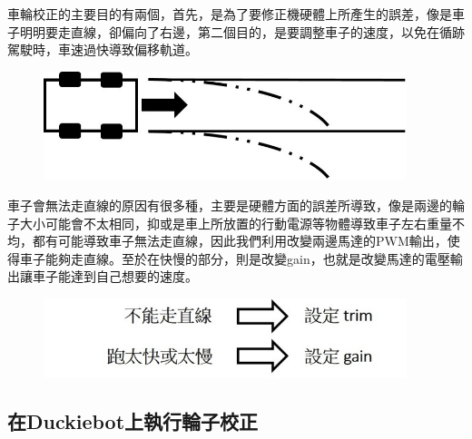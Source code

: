 \documentclass{article}
\begin{document}
車輪校正的主要目的有兩個，首先，是為了要修正機硬體上所產生的誤差，像是車子明明要走直線，卻偏向了右邊，第二個目的，是要調整車子的速度，以免在循跡駕駛時，車速過快導致偏移軌道。
\\
\begin{figure}[htp]
    \begin{center}
        \includegraphics[width=300pt]{pic/圖片22.jpg}
    \end{center}
\end{figure}
車子會無法走直線的原因有很多種，主要是硬體方面的誤差所導致，像是兩邊的輪子大小可能會不太相同，抑或是車上所放置的行動電源等物體導致車子左右重量不均，都有可能導致車子無法走直線，因此我們利用改變兩邊馬達的PWM輸出，使得車子能夠走直線。至於在快慢的部分，則是改變gain，也就是改變馬達的電壓輸出讓車子能達到自己想要的速度。
\\
\begin{figure}[htp]
    \begin{center}
        \includegraphics[width=300pt]{pic/圖片23.jpg}
    \end{center}
\end{figure}

\subsection{在Duckiebot上執行輪子校正}
\end{document}
